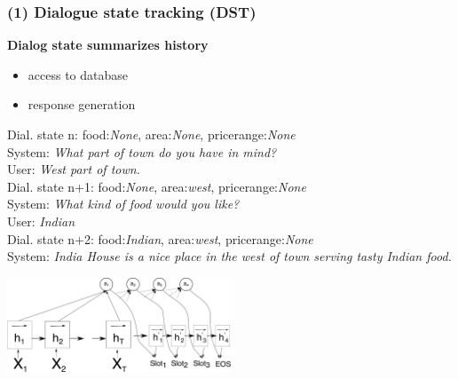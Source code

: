 \documentclass[10pt, compress,british,xcolor={svgnames,dvipsnames,x11names},trans]{beamer}
\def\area#1{{\color{darkgreen}area:\it #1}}
\def\food#1#2{{Dial. state #1: \color{blue}food:\it #2}}
\def\pricerange#1{{\color{orange}pricerange:\it #1}}
\def\sys#1{{\color{purple}System: \it #1}}
\def\usr#1{{\color{brown}User: \it #1}}
\begin{document}
\begin{frame}\frametitle{(1) Dialogue state tracking (DST)}
    {\bf \large Dialog state summarizes history} 
    \begin{itemize}
        \item access to database 
        \item response generation
    \end{itemize}

    {\footnotesize
    \food{n}{None}, \area{None}, \pricerange{None} \\
    \sys{What part of town do you have in mind?} \\
    \usr{West part of town.} \\
    \food{n+1}{None}, \area{west}, \pricerange{None} \\
    \sys{What kind of food would you like?} \\
    \usr{Indian} \\
    \food{n+2}{Indian}, \area{west}, \pricerange{None} \\
    \sys{India House is a nice place in the west of town serving tasty Indian food.} \\
    }

    \begin{center}
        \includegraphics[width=0.5\textwidth]{encdec}
    \end{center}
\end{frame}
\end{document}
